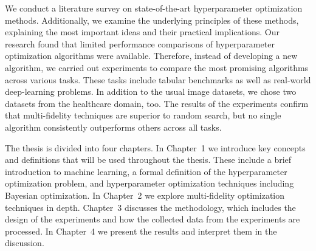 We conduct a literature survey on state-of-the-art hyperparameter optimization methods. Additionally, we examine the underlying principles of these methods, explaining the most important ideas and their practical implications. Our research found that limited performance comparisons of hyperparameter optimization algorithms were available. Therefore, instead of developing a new algorithm, we carried out experiments to compare the most promising algorithms across various tasks. These tasks include tabular benchmarks as well as real-world deep-learning problems. In addition to the usual image datasets, we chose two datasets from the healthcare domain, too. The results of the experiments confirm that multi-fidelity techniques are superior to random search, but no single algorithm consistently outperforms others across all tasks.




The thesis is divided into four chapters. In Chapter~1 we introduce key concepts and definitions that will be used throughout the thesis. These include a brief introduction to machine learning, a formal definition of the hyperparameter optimization problem, and hyperparameter optimization techniques including Bayesian optimization. In Chapter~2 we explore multi-fidelity optimization techniques in depth. Chapter~3 discusses the methodology, which includes the design of the experiments and how the collected data from the experiments are processed. In Chapter~4 we present the results and interpret them in the discussion.


